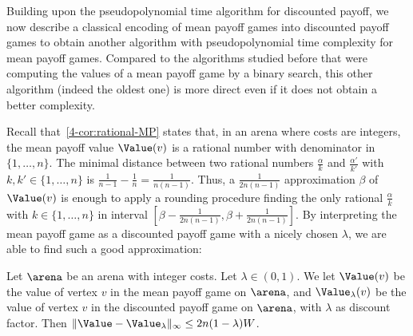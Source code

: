Building upon the pseudopolynomial time algorithm for
discounted payoff, we now describe a classical encoding of mean payoff
games into discounted payoff games to obtain another algorithm with
pseudopolynomial time complexity for mean payoff games. Compared to
the algorithms studied before that were computing the values of a
mean payoff game by a binary search, this other algorithm (indeed the
oldest one) is more direct even if it does not obtain a better
complexity.

Recall that~\cref{4-cor:rational-MP} states that, in an arena where
costs are integers, the mean payoff value $\Value(v)$ is a rational
number with denominator in $\{1,\ldots,n\}$. The minimal distance
between two rational numbers $\frac \alpha k$ and $\frac{\alpha'}{k'}$
with $k,k'\in \{1,\ldots,n\}$ is
$\frac 1{n-1}-\frac 1{n}=\frac{1}{n(n-1)}$. Thus, a
$\frac{1}{2n(n-1)}$ approximation $\beta$ of $\Value(v)$ is enough
to apply a rounding procedure finding the only rational
$\frac \alpha k$ with $k\in \{1,\ldots,n\}$ in interval
$[\beta-\frac{1}{2n(n-1)}, \beta+\frac{1}{2n(n-1)}]$. By
interpreting the mean payoff game as a discounted payoff game with a
nicely chosen $\lambda$, we are able to find such a good
approximation:
\begin{theorem}\label{4-thm:MP-Zwick-Paterson}
  Let $\arena$ be an arena with integer costs. Let
  $\lambda\in(0,1)$. We let $\Value(v)$ be the value of vertex $v$ in
  the mean payoff game on $\arena$, and $\Value_\lambda(v)$ be the
  value of vertex $v$ in the discounted payoff game on $\arena$, with
  $\lambda$ as discount factor. Then
  $\|\Value-\Value_\lambda\|_\infty\leq 2n(1-\lambda)W$.
\end{theorem}
